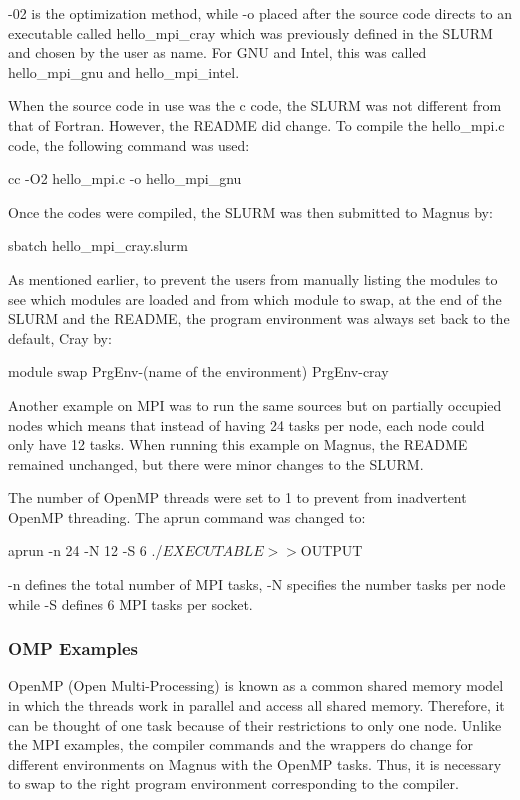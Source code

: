 \documentclass[journal]{IEEEtran}
\begin{document}
-02 is the optimization method, while -o placed after the source code directs to an executable called hello_mpi_cray which was previously defined in the
SLURM and chosen by the user as name. For GNU and Intel, this was called hello_mpi_gnu and hello_mpi_intel. 

When the source code in use was the c code, the SLURM was not different from that of Fortran. However, the README did change. To compile the hello_mpi.c 
code, the following command was used: 

cc -O2 hello_mpi.c -o hello_mpi_gnu

Once the codes were compiled, the SLURM was then submitted to Magnus by:

sbatch hello_mpi_cray.slurm 

As mentioned earlier, to prevent the users from manually listing the modules to see which modules are loaded and from which module to swap, at the end
of the SLURM and the README, the program environment was always set back to the default, Cray by:

module swap PrgEnv-(name of the environment) PrgEnv-cray

Another example on MPI was to run the same sources but on partially occupied nodes which means that instead of having 24 tasks per node, each node could
only have 12 tasks. When running this example on Magnus, the README remained unchanged, but there were minor changes to the SLURM.

The number of OpenMP threads were set to 1 to prevent from inadvertent OpenMP threading. The aprun command was changed to:

aprun -n 24 -N 12 -S 6 ./$EXECUTABLE >> ${OUTPUT}

-n defines the total number of MPI tasks, -N specifies the number tasks per node while -S defines 6 MPI tasks per socket.

\subsubsection{OMP Examples}

OpenMP (Open Multi-Processing) is known as a common shared memory model in which the threads work in parallel and access all shared memory. Therefore,
it can be thought of one task because of their restrictions to only one node. Unlike the MPI examples, the compiler commands and the wrappers do change 
for different environments on Magnus with the OpenMP tasks. Thus, it is necessary to swap to the right program environment corresponding to the compiler.
\end{document}
